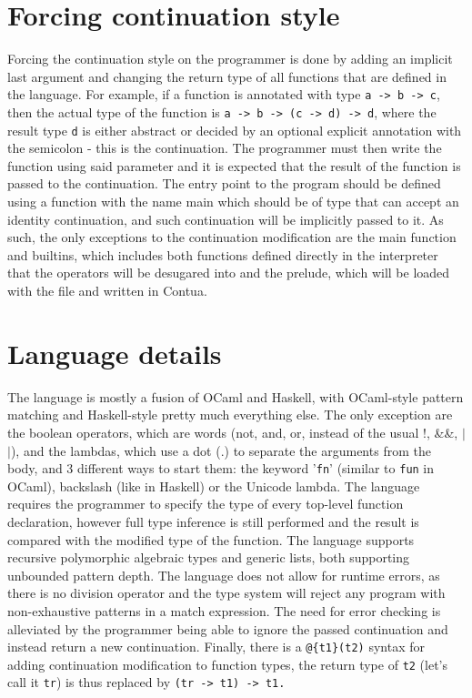 \documentclass{article}
\begin{document}
	\section{Forcing continuation style}
	Forcing the continuation style on the programmer is done by adding an implicit last argument
	and changing the return type of all functions that are defined in the language.
	For example, if a function is annotated with type \texttt{a -> b -> c},
	then the actual type of the function is \texttt{a -> b -> (c -> d) -> d},
	where the result type \texttt{d} is either abstract or decided by an optional explicit annotation with the semicolon - this is the continuation.
	The programmer must then write the function using said parameter and it is expected that 
	the result of the function is passed to the continuation. The entry point to the program should be defined using a function with the name main which should be of type that can accept an identity continuation, and such continuation will be implicitly passed to it.
	As such, the only exceptions to the continuation modification are the main function and builtins, which includes both functions defined directly in the interpreter that the operators will be desugared into and the prelude, which will be loaded with the file and written in Contua.	
	\section{Language details}
	The language is mostly a fusion of OCaml and Haskell, with OCaml-style pattern matching and
	Haskell-style pretty much everything else. The only exception are the boolean operators,
	which are words (not, and, or, instead of the usual !, \&\&, $|$$|$), and the lambdas, which
	use a dot (.) to separate the arguments from the body, and 3 different ways to start them:
	the keyword '\texttt{fn}' (similar to \texttt{fun} in OCaml), backslash (like in Haskell) or the Unicode lambda.
	The language requires the programmer to specify the type of every top-level function declaration, however full type inference is still performed and the result is compared with the modified type of the function.
	The language supports recursive polymorphic algebraic types and generic lists, both supporting 
	unbounded pattern depth. The language does not allow for runtime errors, as there is no division operator and the type system will reject any program with non-exhaustive patterns in a match expression. The need for error checking is alleviated by the programmer being able to ignore the passed continuation and instead return a new continuation.
	Finally, there is a \texttt{@\{t1\}(t2)} syntax for adding continuation modification to function types, the return type of \texttt{t2} (let's call it \texttt{tr}) is thus replaced by \texttt{(tr~->~t1)~->~t1.}
\end{document}

